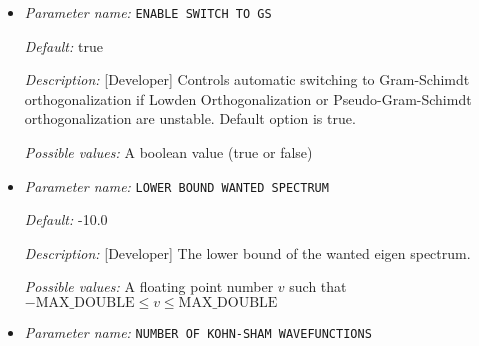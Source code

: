\begin{itemize}


{\it Default:} 0


{\it Description:} [Developer] The degree of the Chebyshev polynomial to be employed for filtering out the unwanted spectrum. A heuristics value depending upon the upper bound of the eigen spectrum is used when the parameter value is 0, which is the default option.


{\it Possible values:} An integer $n$ such that $0\leq n \leq 2000$
\item {\it Parameter name:} {\tt ENABLE SWITCH TO GS}
\label{parameters:SCF parameters/Eigen_2dsolver_2fChebyshev solver related parameters/ENABLE SWITCH TO GS}
\label{parameters:SCF_20parameters/Eigen_2dsolver_2fChebyshev_20solver_20related_20parameters/ENABLE_20SWITCH_20TO_20GS}




{\it Default:} true


{\it Description:} [Developer] Controls automatic switching to Gram-Schimdt orthogonalization if Lowden Orthogonalization or Pseudo-Gram-Schimdt orthogonalization are unstable. Default option is true.


{\it Possible values:} A boolean value (true or false)
\item {\it Parameter name:} {\tt LOWER BOUND WANTED SPECTRUM}
\label{parameters:SCF parameters/Eigen_2dsolver_2fChebyshev solver related parameters/LOWER BOUND WANTED SPECTRUM}
\label{parameters:SCF_20parameters/Eigen_2dsolver_2fChebyshev_20solver_20related_20parameters/LOWER_20BOUND_20WANTED_20SPECTRUM}




{\it Default:} -10.0


{\it Description:} [Developer] The lower bound of the wanted eigen spectrum.


{\it Possible values:} A floating point number $v$ such that $-\text{MAX\_DOUBLE} \leq v \leq \text{MAX\_DOUBLE}$
\item {\it Parameter name:} {\tt NUMBER OF KOHN-SHAM WAVEFUNCTIONS}
\label{parameters:SCF parameters/Eigen_2dsolver_2fChebyshev solver related parameters/NUMBER OF KOHN_2dSHAM WAVEFUNCTIONS}
\label{parameters:SCF_20parameters/Eigen_2dsolver_2fChebyshev_20solver_20related_20parameters/NUMBER_20OF_20KOHN_2dSHAM_20WAVEFUNCTIONS}



\end{itemize}
